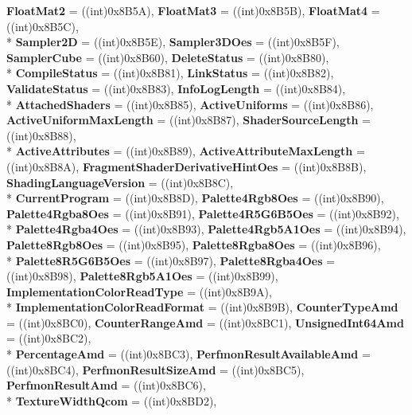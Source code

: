 \begin{DoxyCompactItemize}
{\bfseries Float\-Mat2} = ((int)0x8\-B5\-A), 
{\bfseries Float\-Mat3} = ((int)0x8\-B5\-B), 
{\bfseries Float\-Mat4} = ((int)0x8\-B5\-C), 
\\*
{\bfseries Sampler2\-D} = ((int)0x8\-B5\-E), 
{\bfseries Sampler3\-D\-Oes} = ((int)0x8\-B5\-F), 
{\bfseries Sampler\-Cube} = ((int)0x8\-B60), 
{\bfseries Delete\-Status} = ((int)0x8\-B80), 
\\*
{\bfseries Compile\-Status} = ((int)0x8\-B81), 
{\bfseries Link\-Status} = ((int)0x8\-B82), 
{\bfseries Validate\-Status} = ((int)0x8\-B83), 
{\bfseries Info\-Log\-Length} = ((int)0x8\-B84), 
\\*
{\bfseries Attached\-Shaders} = ((int)0x8\-B85), 
{\bfseries Active\-Uniforms} = ((int)0x8\-B86), 
{\bfseries Active\-Uniform\-Max\-Length} = ((int)0x8\-B87), 
{\bfseries Shader\-Source\-Length} = ((int)0x8\-B88), 
\\*
{\bfseries Active\-Attributes} = ((int)0x8\-B89), 
{\bfseries Active\-Attribute\-Max\-Length} = ((int)0x8\-B8\-A), 
{\bfseries Fragment\-Shader\-Derivative\-Hint\-Oes} = ((int)0x8\-B8\-B), 
{\bfseries Shading\-Language\-Version} = ((int)0x8\-B8\-C), 
\\*
{\bfseries Current\-Program} = ((int)0x8\-B8\-D), 
{\bfseries Palette4\-Rgb8\-Oes} = ((int)0x8\-B90), 
{\bfseries Palette4\-Rgba8\-Oes} = ((int)0x8\-B91), 
{\bfseries Palette4\-R5\-G6\-B5\-Oes} = ((int)0x8\-B92), 
\\*
{\bfseries Palette4\-Rgba4\-Oes} = ((int)0x8\-B93), 
{\bfseries Palette4\-Rgb5\-A1\-Oes} = ((int)0x8\-B94), 
{\bfseries Palette8\-Rgb8\-Oes} = ((int)0x8\-B95), 
{\bfseries Palette8\-Rgba8\-Oes} = ((int)0x8\-B96), 
\\*
{\bfseries Palette8\-R5\-G6\-B5\-Oes} = ((int)0x8\-B97), 
{\bfseries Palette8\-Rgba4\-Oes} = ((int)0x8\-B98), 
{\bfseries Palette8\-Rgb5\-A1\-Oes} = ((int)0x8\-B99), 
{\bfseries Implementation\-Color\-Read\-Type} = ((int)0x8\-B9\-A), 
\\*
{\bfseries Implementation\-Color\-Read\-Format} = ((int)0x8\-B9\-B), 
{\bfseries Counter\-Type\-Amd} = ((int)0x8\-B\-C0), 
{\bfseries Counter\-Range\-Amd} = ((int)0x8\-B\-C1), 
{\bfseries Unsigned\-Int64\-Amd} = ((int)0x8\-B\-C2), 
\\*
{\bfseries Percentage\-Amd} = ((int)0x8\-B\-C3), 
{\bfseries Perfmon\-Result\-Available\-Amd} = ((int)0x8\-B\-C4), 
{\bfseries Perfmon\-Result\-Size\-Amd} = ((int)0x8\-B\-C5), 
{\bfseries Perfmon\-Result\-Amd} = ((int)0x8\-B\-C6), 
\\*
{\bfseries Texture\-Width\-Qcom} = ((int)0x8\-B\-D2), 

\end{DoxyCompactItemize}

